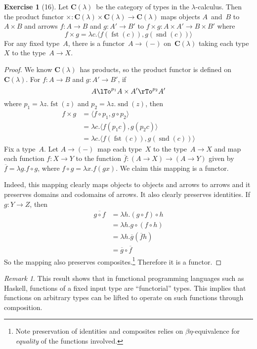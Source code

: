 \documentclass[letterpaper,12pt]{article}
\newcommand{\after}{\circ}
\DeclareMathOperator{\fst}{fst}
\DeclareMathOperator{\snd}{snd}
\newcommand{\pair}[2]{\langle{#1},{#2}\rangle}
\newcommand{\cat}[1]{\mathbf{#1}}
\newcommand{\C}{\cat{C}}
\newcommand{\Types}{\C(\lambda)}
\theoremstyle{definition}
\newtheorem*{exer}{Exercise}
\theoremstyle{remark}
\newtheorem*{rmk}{Remark}
\theoremstyle{direction}
\begin{document}
\begin{exer}[16]
Let \(\Types\)~be the category of types in the \(\lambda\)-calculus. Then the product functor \(\times:\Types\times\Types\to\Types\) maps objects \(A\)~and~\(B\) to~\(A\times B\) and arrows \(f:A\to B\) and \(g:A'\to B'\) to \(f\times g:A\times A'\to B\times B'\) where
\[f\times g=\lambda c.\pair{f(\fst(c))}{g(\snd(c))}\]
For any fixed type~\(A\), there is a functor~\(A\to(-)\) on~\(\Types\) taking each type~\(X\) to the type~\(A\to X\).
\end{exer}
\begin{proof}
We know \(\Types\)~has products, so the product functor is defined on~\(\Types\). For \(f:A\to B\) and \(g:A'\to B'\), if
\[A\lTo^{p_1}A\times A'\rTo^{p_2}A'\]
where \(p_1=\lambda z.\fst(z)\) and \(p_2=\lambda z.\snd(z)\), then
\begin{align*}
f\times g&=\pair{f\after p_1}{g\after p_2}\\
	&=\lambda c.\pair{f(p_1c)}{g(p_2c)}\\
	&=\lambda c.\pair{f(\fst(c))}{g(\snd(c))}
\end{align*}
Fix a type~\(A\). Let \(A\to(-)\)~map each type~\(X\) to the type~\(A\to X\) and map each function \(f:X\to Y\) to the function \(\overline{f}:(A\to X)\to(A\to Y)\) given by \(\overline{f}=\lambda g.f\after g\), where \(f\after g=\lambda x.f(gx)\). We claim this mapping is a functor.

Indeed, this mapping clearly maps objects to objects and arrows to arrows and it preserves domains and codomains of arrows. It also clearly preserves identities. If \(g:Y\to Z\), then
\begin{align*}
\overline{g\after f}&=\lambda h.(g\after f)\after h\\
	&=\lambda h.g\after(f\after h)\\
	&=\lambda h.\overline{g}(\overline{f}h)\\
	&=\overline{g}\after\overline{f}
\end{align*}
So the mapping also preserves composites.\footnote{Note preservation of identities and composites relies on \(\beta\eta\)-equivalence for \emph{equality} of the functions involved.} Therefore it is a functor.
\end{proof}
\begin{rmk}
This result shows that in functional programming languages such as Haskell, functions of a fixed input type are ``functorial'' types. This implies that functions on arbitrary types can be lifted to operate on such functions through composition.
\end{rmk}
\end{document}
